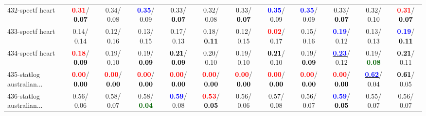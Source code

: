 \begin{table}[h]
\begin{center}
{\begin{tabular}{lc|c|c|c|c|c|c|c|c|c|c}
432-spectf heart & \textcolor{red}{\textbf{  0.31}}/\textcolor{black}{\textbf{  0.07}} &   0.34/  0.08 & \textcolor{blue}{\textbf{  0.35}}/  0.09 &   0.33/\textcolor{black}{\textbf{  0.07}} &   0.32/  0.08 &   0.33/\textcolor{black}{\textbf{  0.07}} & \textcolor{blue}{\textbf{  0.35}}/  0.09 & \textcolor{blue}{\textbf{  0.35}}/  0.09 &   0.33/\textcolor{black}{\textbf{  0.07}} &   0.32/  0.10 & \textcolor{red}{\textbf{  0.31}}/\textcolor{black}{\textbf{  0.07}} \\
433-spectf heart &   0.14/  0.14 &   0.12/  0.16 &   0.13/  0.15 &   0.17/  0.13 &   0.18/\textcolor{black}{\textbf{  0.11}} &   0.12/  0.15 & \textcolor{red}{\textbf{  0.02}}/  0.17 &   0.15/  0.16 & \textcolor{blue}{\textbf{  0.19}}/  0.12 &   0.13/  0.13 & \textcolor{blue}{\textbf{  0.19}}/\textcolor{black}{\textbf{  0.11}} \\
434-spectf heart & \textcolor{red}{\textbf{  0.18}}/\textcolor{black}{\textbf{  0.09}} &   0.19/  0.10 &   0.19/\textcolor{black}{\textbf{  0.09}} & \textcolor{black}{\textbf{  0.21}}/\textcolor{black}{\textbf{  0.09}} &   0.20/  0.10 &   0.19/  0.10 & \textcolor{black}{\textbf{  0.21}}/  0.10 &   0.19/\textcolor{black}{\textbf{  0.09}} & \underline{\textcolor{blue}{\textbf{  0.23}}}/  0.12 &   0.19/\textcolor{darkgreen}{\textbf{  0.08}} & \textcolor{black}{\textbf{  0.21}}/  0.11 \\
435-statlog australian... & \textcolor{red}{\textbf{  0.00}}/\textcolor{black}{\textbf{  0.00}} & \textcolor{red}{\textbf{  0.00}}/\textcolor{black}{\textbf{  0.00}} & \textcolor{red}{\textbf{  0.00}}/\textcolor{black}{\textbf{  0.00}} & \textcolor{red}{\textbf{  0.00}}/\textcolor{black}{\textbf{  0.00}} & \textcolor{red}{\textbf{  0.00}}/\textcolor{black}{\textbf{  0.00}} & \textcolor{red}{\textbf{  0.00}}/\textcolor{black}{\textbf{  0.00}} & \textcolor{red}{\textbf{  0.00}}/\textcolor{black}{\textbf{  0.00}} & \textcolor{red}{\textbf{  0.00}}/\textcolor{black}{\textbf{  0.00}} & \textcolor{red}{\textbf{  0.00}}/\textcolor{black}{\textbf{  0.00}} & \underline{\textcolor{blue}{\textbf{  0.62}}}/  0.04 & \textcolor{black}{\textbf{  0.61}}/  0.05 \\
436-statlog australian... &   0.56/  0.06 &   0.58/  0.07 &   0.58/\textcolor{darkgreen}{\textbf{  0.04}} & \textcolor{blue}{\textbf{  0.59}}/  0.08 & \textcolor{red}{\textbf{  0.53}}/\textcolor{black}{\textbf{  0.05}} &   0.56/  0.06 &   0.57/  0.08 &   0.56/  0.07 & \textcolor{blue}{\textbf{  0.59}}/\textcolor{black}{\textbf{  0.05}} &   0.55/  0.07 &   0.56/  0.07 \\

\end{tabular}}
\end{center}
\end{table}
